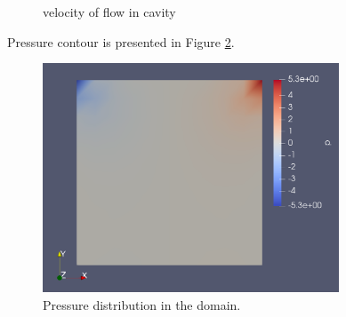 \documentclass[]{article}
\begin{document}
\begin{figure}[htbp]
	\centering
	\qquad
	\caption{velocity of flow in cavity}%
	\label{fig_Rs1}%
\end{figure}
Pressure contour is presented in Figure \ref{fig_Rs2}.
\begin{figure}[htbp]
	\centering
	\includegraphics[width=250pt]{Figures/p.png}
	\caption{Pressure distribution in the domain.}
	\label{fig_Rs2}
\end{figure}


\end{document}
